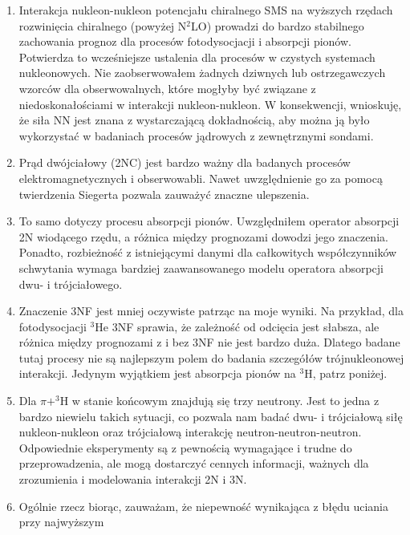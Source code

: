 \documentclass[a4paper, 14pt]{extarticle}
\begin{document}
\begin{enumerate}
\item Interakcja nukleon-nukleon potencja\l{}u chiralnego SMS na wy\.zszych rz\k{e}dach rozwini\k{e}cia chiralnego (powy\.zej N$^2$LO) prowadzi do bardzo stabilnego zachowania prognoz dla proces\'ow fotodysocjacji i absorpcji pion\'ow.
Potwierdza to wcześniejsze ustalenia dla proces\'ow w czystych systemach nukleonowych.
Nie zaobserwowa\l{}em \.zadnych dziwnych lub ostrzegawczych wzorc\'ow dla obserwowalnych, kt\'ore mog\l{}yby by\'c zwi\k{a}zane z niedoskona\l{}ościami w interakcji nukleon-nukleon.
W konsekwencji, wnioskuj\k{e}, \.ze si\l{}a NN jest znana z wystarczaj\k{a}c\k{a} dok\l{}adności\k{a}, aby mo\.zna j\k{a} by\l{}o wykorzysta\'c w badaniach proces\'ow j\k{a}drowych z zewn\k{e}trznymi sondami.
\item Pr\k{a}d dw\'ojcia\l{}owy (2NC) jest bardzo wa\.zny dla badanych proces\'ow elektromagnetycznych i obserwowabli. Nawet uwzgl\k{e}dnienie go za pomoc\k{a} twierdzenia Siegerta pozwala zauwa\.zy\'c znaczne ulepszenia.
\item To samo dotyczy procesu absorpcji pion\'ow. Uwzgl\k{e}dni\l{}em operator absorpcji 2N wiod\k{a}cego rz\k{e}du, a r\'o\.znica mi\k{e}dzy prognozami dowodzi jego znaczenia.
Ponadto, rozbie\.znoś\'c z istniej\k{a}cymi danymi dla ca\l{}kowitych wsp\'o\l{}czynnik\'ow schwytania wymaga bardziej zaawansowanego modelu operatora absorpcji dwu- i tr\'ojcia\l{}owego.
\item Znaczenie 3NF jest mniej oczywiste patrz\k{a}c na moje wyniki.
Na przyk\l{}ad, dla fotodysocjacji $^3$He 3NF sprawia, \.ze zale\.znoś\'c od odci\k{e}cia jest s\l{}absza,
ale r\'o\.znica mi\k{e}dzy prognozami z i bez 3NF nie jest bardzo du\.za.
Dlatego badane tutaj procesy nie s\k{a} najlepszym polem do badania szczeg\'o\l{}\'ow tr\'ojnukleonowej interakcji.
Jedynym wyj\k{a}tkiem jest absorpcja pion\'ow na $^3$H, patrz poni\.zej.
\item Dla $\pi + ^3$H w stanie końcowym znajduj\k{a} si\k{e} trzy neutrony. Jest to jedna z bardzo niewielu takich sytuacji, co pozwala nam bada\'c
dwu- i tr\'ojcia\l{}ow\k{a} si\l{}\k{e} nukleon-nukleon oraz tr\'ojcia\l{}ow\k{a} interakcj\k{e} neutron-neutron-neutron.
Odpowiednie eksperymenty s\k{a} z pewności\k{a} wymagaj\k{a}ce i trudne do przeprowadzenia, ale
mog\k{a} dostarczy\'c cennych informacji, wa\.znych dla zrozumienia i modelowania
interakcji 2N i 3N.
\item Og\'olnie rzecz bior\k{a}c, zauwa\.zam, \.ze niepewnoś\'c wynikaj\k{a}ca z b\l{}\k{e}du uciania przy najwy\.zszym

\end{enumerate}
\end{document}
